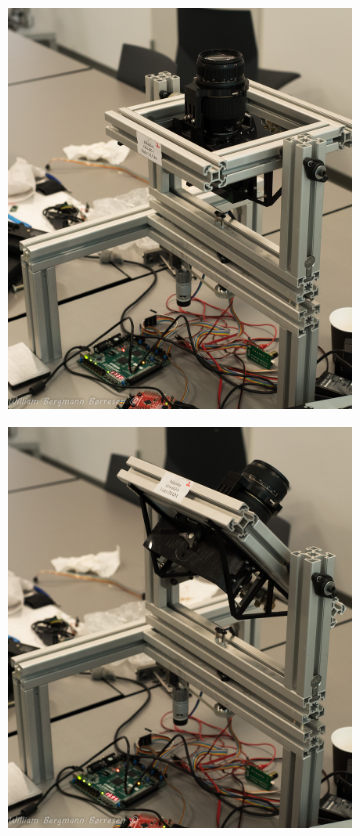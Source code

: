 \begin{figure}[!h]
\begin{subfigure}[b]{0.3\textwidth}
        \includegraphics[width=1\textwidth]{Billeder/Nulpunkt.jpg}
        \caption{}
        \label{fig:Nulpunkt}
    \end{subfigure}
    \begin{subfigure}[b]{0.3\textwidth}
        \includegraphics[width=1\textwidth]{Billeder/Tilt315deg.jpg}

\end{subfigure}
\end{figure}
